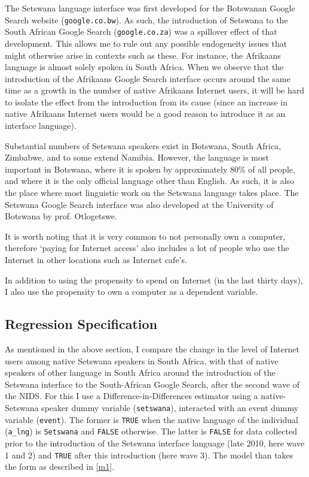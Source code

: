 \documentclass[a4paper,british]{article}\usepackage[]{graphicx}\usepackage[]{color}
\newcommand{\code}[1]{\texttt{#1}}
\begin{document}
The Setswana language interface was first developed for the Botswanan
Google Search website (\code{google.co.bw}). As such, the introduction
of Setswana to the South African Google Search (\code{google.co.za})
was a spillover effect of that development. This allows me to rule
out any possible endogeneity issues that might otherwise arise in
contexts such as these. For instance, the Afrikaans language is almost
solely spoken in South Africa. When we observe that the introduction
of the Afrikaans Google Search interface occurs around the same time
as a growth in the number of native Afrikaans Internet users, it will
be hard to isolate the effect from the introduction from its cause
(since an increase in native Afrikaans Internet users would be a good
reason to introduce it as an interface language).

Substantial numbers of Setswana speakers exist in Botswana, South
Africa, Zimbabwe, and to some extend Namibia. However, the language
is most important in Botswana, where it is spoken by approximately
80\% of all people, and where it is the only official language other
than English. As such, it is also the place where most linguistic
work on the Setswana language takes place. The Setswana Google Search
interface was also developed at the University of Botswana by prof.
Otlogetswe.

It is worth noting that it is very common to not personally own a
computer, therefore `paying for Internet access' also includes a lot
of people who use the Internet in other locations such as Internet
cafe's.

In addition to using the propensity to spend on Internet (in the last
thirty days), I also use the propensity to own a computer as a dependent
variable. 

\subsection{Regression Specification}

\label{subsec:estimation}As mentioned in the above section, I compare
the change in the level of Internet users among native Setswana speakers
in South Africa, with that of native speakers of other language in
South Africa around the introduction of the Setswana interface to
the South-African Google Search, after the second wave of the NIDS.
For this I use a Difference-in-Differences estimator \citep{abadie2005semiparametric,imbens2009econometrics}
using a native-Setswana speaker dummy variable (\code{setswana}),
interacted with an event dummy variable (\code{event}). The former
is \code{TRUE} when the native language of the individual (\code{a\_lng})
is \code{Setswana} and \code{FALSE} otherwise. The latter is \code{FALSE}
for data collected prior to the introduction of the Setswana interface
language (late 2010, here wave 1 and 2) and \code{TRUE} after this
introduction (here wave 3). The model than takes the form as described
in \eqref{m1}.
\end{document}
